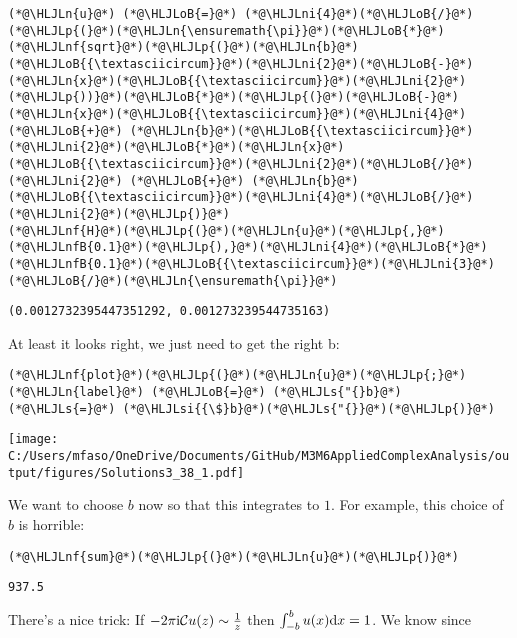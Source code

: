 \documentclass[12pt,a4paper]{article}
\newcommand{\HLJLn}[1]{#1}
\newcommand{\HLJLnf}[1]{\textcolor[RGB]{66,102,213}{#1}}
\newcommand{\HLJLs}[1]{\textcolor[RGB]{201,61,57}{#1}}
\newcommand{\HLJLsi}[1]{#1}
\newcommand{\HLJLnfB}[1]{\textcolor[RGB]{59,151,46}{#1}}
\newcommand{\HLJLni}[1]{\textcolor[RGB]{59,151,46}{#1}}
\newcommand{\HLJLoB}[1]{\textcolor[RGB]{102,102,102}{\textbf{#1}}}
\newcommand{\HLJLp}[1]{#1}
\def\D{ {\rm d} }
\def\I{ {\rm i} }
\def\CC{ {\cal C} }
\def\dx{\D x}
\begin{document}
\begin{lstlisting}
(*@\HLJLn{u}@*) (*@\HLJLoB{=}@*) (*@\HLJLni{4}@*)(*@\HLJLoB{/}@*)(*@\HLJLp{(}@*)(*@\HLJLn{\ensuremath{\pi}}@*)(*@\HLJLoB{*}@*)(*@\HLJLnf{sqrt}@*)(*@\HLJLp{(}@*)(*@\HLJLn{b}@*)(*@\HLJLoB{{\textasciicircum}}@*)(*@\HLJLni{2}@*)(*@\HLJLoB{-}@*)(*@\HLJLn{x}@*)(*@\HLJLoB{{\textasciicircum}}@*)(*@\HLJLni{2}@*)(*@\HLJLp{))}@*)(*@\HLJLoB{*}@*)(*@\HLJLp{(}@*)(*@\HLJLoB{-}@*)(*@\HLJLn{x}@*)(*@\HLJLoB{{\textasciicircum}}@*)(*@\HLJLni{4}@*) (*@\HLJLoB{+}@*) (*@\HLJLn{b}@*)(*@\HLJLoB{{\textasciicircum}}@*)(*@\HLJLni{2}@*)(*@\HLJLoB{*}@*)(*@\HLJLn{x}@*)(*@\HLJLoB{{\textasciicircum}}@*)(*@\HLJLni{2}@*)(*@\HLJLoB{/}@*)(*@\HLJLni{2}@*) (*@\HLJLoB{+}@*) (*@\HLJLn{b}@*)(*@\HLJLoB{{\textasciicircum}}@*)(*@\HLJLni{4}@*)(*@\HLJLoB{/}@*)(*@\HLJLni{2}@*)(*@\HLJLp{)}@*)
(*@\HLJLnf{H}@*)(*@\HLJLp{(}@*)(*@\HLJLn{u}@*)(*@\HLJLp{,}@*) (*@\HLJLnfB{0.1}@*)(*@\HLJLp{),}@*)(*@\HLJLni{4}@*)(*@\HLJLoB{*}@*)(*@\HLJLnfB{0.1}@*)(*@\HLJLoB{{\textasciicircum}}@*)(*@\HLJLni{3}@*)(*@\HLJLoB{/}@*)(*@\HLJLn{\ensuremath{\pi}}@*)
\end{lstlisting}

\begin{lstlisting}
(0.0012732395447351292, 0.001273239544735163)
\end{lstlisting}


At least it looks right, we just need to get the right b:


\begin{lstlisting}
(*@\HLJLnf{plot}@*)(*@\HLJLp{(}@*)(*@\HLJLn{u}@*)(*@\HLJLp{;}@*) (*@\HLJLn{label}@*) (*@\HLJLoB{=}@*) (*@\HLJLs{"{}b}@*) (*@\HLJLs{=}@*) (*@\HLJLsi{{\$}b}@*)(*@\HLJLs{"{}}@*)(*@\HLJLp{)}@*)
\end{lstlisting}

\texttt{[image: C:/Users/mfaso/OneDrive/Documents/GitHub/M3M6AppliedComplexAnalysis/output/figures/Solutions3\_38\_1.pdf]}

We want to choose $b$ now so that this integrates to $1$. For example, this choice of $b$ is horrible:


\begin{lstlisting}
(*@\HLJLnf{sum}@*)(*@\HLJLp{(}@*)(*@\HLJLn{u}@*)(*@\HLJLp{)}@*)
\end{lstlisting}

\begin{lstlisting}
937.5
\end{lstlisting}


There's a nice trick: If $-2\pi \I \CC u(z) \sim {1 \over  z}$ then $\int_{-b}^b u(x) \dx  = 1$.  We know since
\end{document}

